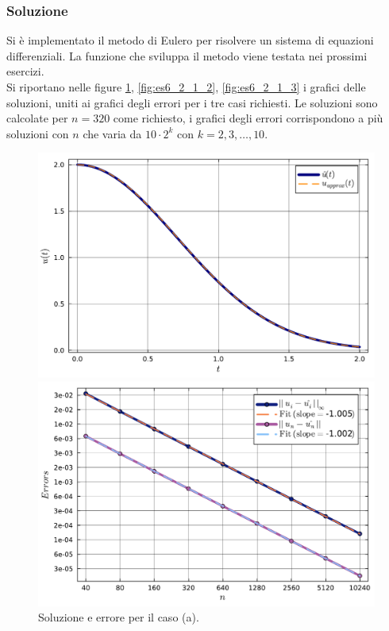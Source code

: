 \documentclass[letterpaper, 12pt]{article}
\numberwithin{equation}{section}    %
\begin{document}
\subsubsection{Soluzione}
Si è implementato il metodo di Eulero per risolvere un sistema di equazioni differenziali. La funzione che 
sviluppa il metodo viene testata nei prossimi esercizi.\\
Si riportano nelle figure \ref{fig:es6_2_1_1}, \ref{fig:es6_2_1_2}, \ref{fig:es6_2_1_3} i grafici delle soluzioni, 
uniti ai grafici degli errori per i tre casi richiesti. Le soluzioni sono calcolate per $n = 320$ come richiesto,
i grafici degli errori corrispondono a più soluzioni con $n$ che varia da $10\cdot2^k$ con $k=2,3,\ldots,10$.
\begin{figure}[!ht]
    \centering
    \begin{minipage}[b]{0.47\textwidth}
        \includegraphics[width=\textwidth]{6221.pdf}
    \end{minipage}
    \hspace{0.5cm}
    \begin{minipage}[b]{0.47\textwidth}
        \includegraphics[width=\textwidth]{6222.pdf}
    \end{minipage}
    \caption{Soluzione e errore per il caso (a).}
    \label{fig:es6_2_1_1}
\end{figure}
\end{document}
